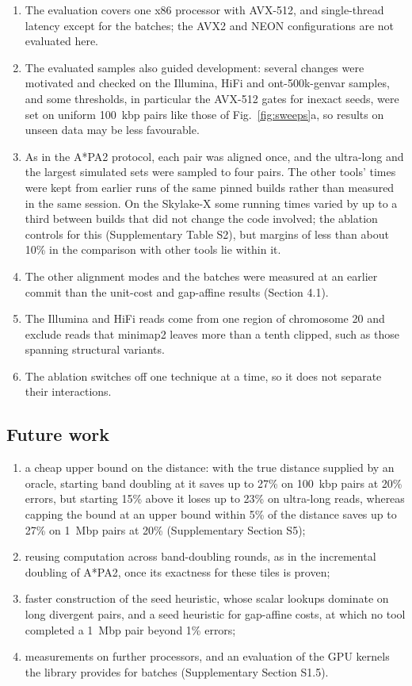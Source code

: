 \documentclass[nocrop,noinfo]{bioinfo}
\begin{document}
\begin{enumerate}
  \item The evaluation covers one x86 processor with AVX-512, and single-thread latency except for the batches; the AVX2 and NEON configurations are not evaluated here.
  \item The evaluated samples also guided development: several changes were motivated and checked on the Illumina, HiFi and ont-500k-genvar samples, and some thresholds, in particular the AVX-512 gates for inexact seeds, were set on uniform 100~kbp pairs like those of Fig.~\ref{fig:sweeps}a, so results on unseen data may be less favourable.
  \item As in the A*PA2 protocol, each pair was aligned once, and the ultra-long and the largest simulated sets were sampled to four pairs. The other tools' times were kept from earlier runs of the same pinned builds rather than measured in the same session. On the Skylake-X some running times varied by up to a third between builds that did not change the code involved; the ablation controls for this (Supplementary Table S2), but margins of less than about 10\% in the comparison with other tools lie within it.
  \item The other alignment modes and the batches were measured at an earlier commit than the unit-cost and gap-affine results (Section 4.1).
  \item The Illumina and HiFi reads come from one region of chromosome 20 and exclude reads that minimap2 leaves more than a tenth clipped, such as those spanning structural variants.
  \item The ablation switches off one technique at a time, so it does not separate their interactions.
\end{enumerate}

\subsection{Future work}

\begin{enumerate}
  \item a cheap upper bound on the distance: with the true distance supplied by an oracle, starting band doubling at it saves up to 27\% on 100~kbp pairs at 20\% errors, but starting 15\% above it loses up to 23\% on ultra-long reads, whereas capping the bound at an upper bound within 5\% of the distance saves up to 27\% on 1~Mbp pairs at 20\% (Supplementary Section S5);
  \item reusing computation across band-doubling rounds, as in the incremental doubling of A*PA2, once its exactness for these tiles is proven;
  \item faster construction of the seed heuristic, whose scalar lookups dominate on long divergent pairs, and a seed heuristic for gap-affine costs, at which no tool completed a 1~Mbp pair beyond 1\% errors;
  \item measurements on further processors, and an evaluation of the GPU kernels the library provides for batches (Supplementary Section S1.5).
\end{enumerate}
\end{document}
